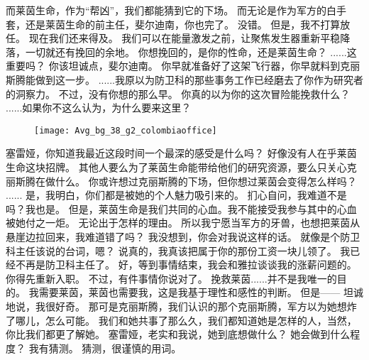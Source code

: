 \documentclass[openany]{book}
\begin{document}
\begin{dialogue}
     而莱茵生命，作为“帮凶”，我们都能猜到它的下场。
     而无论是作为军方的白手套，还是莱茵生命的前主任，斐尔迪南，你也完了。
     没错。
     但是，我不打算放任。
     现在我们还来得及。
     我们可以在能量激发之前，让聚焦发生器重新平稳降落，一切就还有挽回的余地。
     你想挽回的，是你的性命，还是莱茵生命？
     ......这重要吗？
     你该坦诚点，斐尔迪南。
     你早就准备好了这架飞行器，你早就料到克丽斯腾能做到这一步。
     ......我原以为防卫科的那些事务工作已经磨去了你作为研究者的洞察力。
     不过，没有你想的那么早。
     你真的以为你的这次冒险能挽救什么？
     ......如果你不这么认为，为什么要来这里？
    \begin{figure}[h]
        \centering
        \texttt{[image: Avg\_bg\_38\_g2\_colombiaoffice]}
    \end{figure}
     塞雷娅，你知道我最近这段时间一个最深的感受是什么吗？
     好像没有人在乎莱茵生命这块招牌。
     其他人要么为了莱茵生命能带给他们的研究资源，要么只关心克丽斯腾在做什么。
     你或许想过克丽斯腾的下场，但你想过莱茵会变得怎么样吗？
     ......
     是，我明白，你们都是被她的个人魅力吸引来的。
     扪心自问，我难道不是吗？我也是。
     但是，莱茵生命是我们共同的心血。我不能接受我参与其中的心血被她付之一炬。
     无论出于怎样的理由。
     所以我宁愿当军方的牙兽，也想把莱茵从悬崖边拉回来，我难道错了吗？
     我没想到，你会对我说这样的话。
     就像是个防卫科主任该说的台词，嗯？
     说真的，我真该把属于你的那份工资一块儿领了。
     我已经不再是防卫科主任了。
     好，等到事情结束，我会和雅拉谈谈我的涨薪问题的。
     你得先重新入职。
     不过，有件事情你说对了。
     挽救莱茵......并不是我唯一的目的。
     我需要莱茵，莱茵也需要我，这是我基于理性和感性的判断。
     但是——
     坦诚地说，我很好奇。
     那可是克丽斯腾，我们认识的那个克丽斯腾，军方以为她想炸了哪儿，怎么可能。
     我们和她共事了那么久，我们都知道她是怎样的人，当然，你比我们都更了解她。
     塞雷娅，老实和我说，她到底想做什么？
     她会做到什么程度？
     我有猜测。
     猜测，很谨慎的用词。

\end{dialogue}
\end{document}
